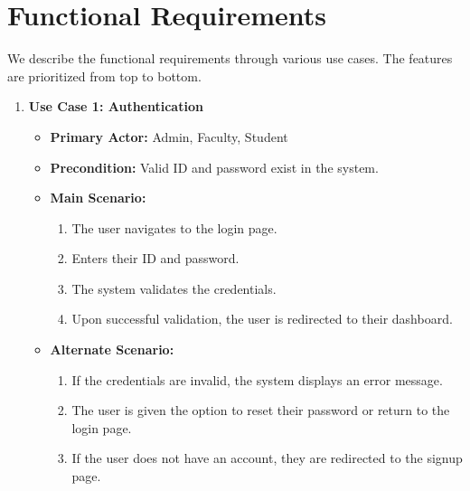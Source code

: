 \documentclass{scrreprt}
\begin{document}
\section{Functional Requirements}
We describe the functional requirements through various use cases. The features are prioritized from top to bottom.

\begin{enumerate}
    \item \textbf{Use Case 1: Authentication}
    \begin{itemize}
        \item \textbf{Primary Actor:} Admin, Faculty, Student
        \item \textbf{Precondition:} Valid ID and password exist in the system.
        \item \textbf{Main Scenario:}
        \begin{enumerate}
            \item The user navigates to the login page.
            \item Enters their ID and password.
            \item The system validates the credentials.
            \item Upon successful validation, the user is redirected to their dashboard.
        \end{enumerate}
        \item \textbf{Alternate Scenario:}
        \begin{enumerate}
            \item If the credentials are invalid, the system displays an error message.
            \item The user is given the option to reset their password or return to the login page.
            \item If the user does not have an account, they are redirected to the signup page.
        \end{enumerate}
    \end{itemize}


\end{enumerate}
\end{document}
